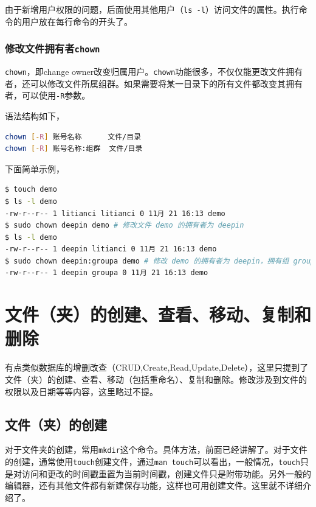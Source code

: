 \documentclass[doctor,openright,twoside]{sjtuthesis}
\newcommand{\passthrough}[1]{#1}
\theoremstyle{plain}
\theoremstyle{definition}
\theoremstyle{remark}
\theoremstyle{ocrenumbox}
\theoremstyle{plain}
\begin{document}
由于新增用户权限的问题，后面使用其他用户（\passthrough{\lstinline!ls -l!}）访问文件的属性。执行命令的用户放在每行命令的开头了。

\hypertarget{chown}{%
\subsubsection{\texorpdfstring{修改文件拥有者\texttt{chown}}{修改文件拥有者chown}}\label{chown}}

\passthrough{\lstinline!chown!}，即change owner改变归属用户。\passthrough{\lstinline!chown!}功能很多，不仅仅能更改文件拥有者，还可以修改文件所属组群。如果需要将某一目录下的所有文件都改变其拥有者，可以使用\passthrough{\lstinline!-R!}参数。

语法结构如下，

\begin{lstlisting}[language=bash]
chown [-R] 账号名称      文件/目录
chown [-R] 账号名称:组群  文件/目录
\end{lstlisting}

下面简单示例，

\begin{lstlisting}[language=bash]
$ touch demo
$ ls -l demo
-rw-r--r-- 1 litianci litianci 0 11月 21 16:13 demo
$ sudo chown deepin demo # 修改文件 demo 的拥有者为 deepin
$ ls -l demo
-rw-r--r-- 1 deepin litianci 0 11月 21 16:13 demo
$ sudo chown deepin:groupa demo # 修改 demo 的拥有者为 deepin，拥有组 groupa
-rw-r--r-- 1 deepin groupa 0 11月 21 16:13 demo
\end{lstlisting}

\hypertarget{section-69}{%
\section{文件（夹）的创建、查看、移动、复制和删除}\label{section-69}}

有点类似数据库的增删改查（CRUD,Create,Read,Update,Delete），这里只提到了文件（夹）的创建、查看、移动（包括重命名）、复制和删除。修改涉及到文件的权限以及日期等等内容，这里略过不提。

\hypertarget{section-70}{%
\subsection{文件（夹）的创建}\label{section-70}}

对于文件夹的创建，常用\passthrough{\lstinline!mkdir!}这个命令。具体方法，前面已经讲解了。对于文件的创建，通常使用\passthrough{\lstinline!touch!}创建文件，通过\passthrough{\lstinline!man touch!}可以看出，一般情况，\passthrough{\lstinline!touch!}只是对访问和更改的时间戳重置为当前时间戳，创建文件只是附带功能。另外一般的编辑器，还有其他文件都有新建保存功能，这样也可用创建文件。这里就不详细介绍了。
\end{document}

